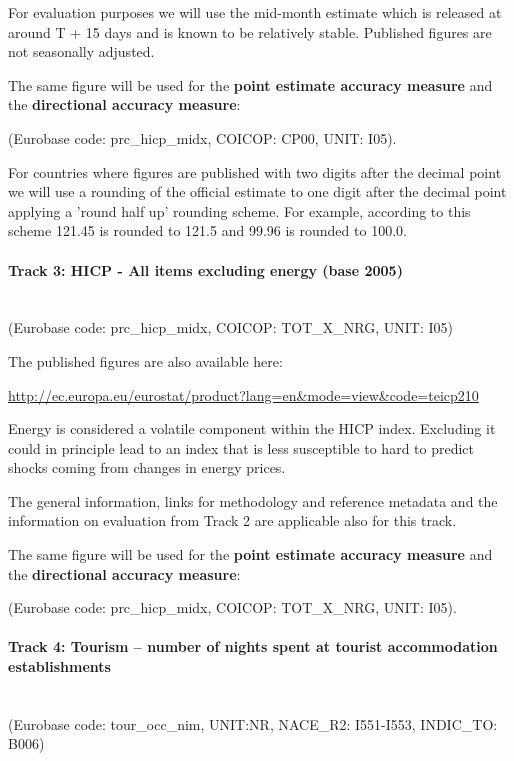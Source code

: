 \documentclass[12pt]{article}
\begin{document}
For evaluation purposes we will use the mid-month estimate which is released at around T + 15 days and is known to be relatively stable. Published figures are not seasonally adjusted. 

The same figure will be used for the \textbf{point estimate accuracy measure} and the \textbf{directional accuracy measure}:

(Eurobase code: prc\_hicp\_midx, COICOP: CP00, UNIT: I05).


For countries where figures are published with two digits after the decimal point we will use a rounding of the official estimate to one digit after the decimal point applying a 'round half up' rounding scheme. For example, according to this scheme 121.45 is rounded to 121.5 and 99.96 is rounded to 100.0.



\paragraph{Track 3: HICP - All items excluding energy (base 2005)}
\textbf{ }\\
(Eurobase code: prc\_hicp\_midx, COICOP: TOT\_X\_NRG, UNIT: I05)


The published figures are also available here:

\url{http://ec.europa.eu/eurostat/product?lang=en&mode=view&code=teicp210}

Energy is considered a volatile component within the HICP index.  Excluding it could in principle lead to an index that is less susceptible to hard to predict shocks coming from changes in energy prices.

The general information, links for methodology and reference metadata and the information on evaluation from Track 2 are applicable also for this track. 

The same figure will be used for the \textbf{point estimate accuracy measure} and the \textbf{directional accuracy measure}:

(Eurobase code: prc\_hicp\_midx, COICOP: TOT\_X\_NRG, UNIT: I05).

\paragraph{Track 4: Tourism – number of nights spent at tourist accommodation establishments}
\label{track_tourism_I551_I553}
\textbf{ }\\
(Eurobase code: tour\_occ\_nim, UNIT:NR, NACE\_R2: I551-I553, INDIC\_TO: B006)
\end{document}
